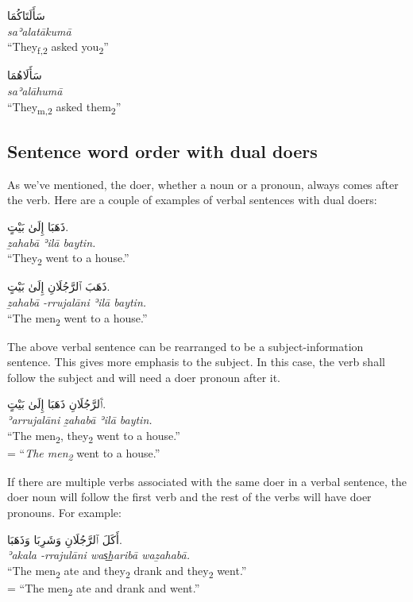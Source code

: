 \documentclass[
  10pt,
]{book}
\begin{document}
\foreignlanguage{arabic}{سَأَلَتَاکُمَا}\\
\emph{saʾalatākumā}\\
\enquote{They\textsubscript{f,2} asked you\textsubscript{2}}

\foreignlanguage{arabic}{سَأَلَاهُمَا}\\
\emph{saʾalāhumā}\\
\enquote{They\textsubscript{m,2} asked them\textsubscript{2}}

\subsection{Sentence word order with dual doers}\label{sentence-word-order-with-dual-doers}

As we've mentioned, the doer, whether a noun or a pronoun, always comes after the verb. Here are a couple of examples of verbal sentences with dual doers:

\foreignlanguage{arabic}{ذَهَبَا إِلَىٰ بَيْتٍ.}\\
\emph{ẕahabā ʾilā baytin.}\\
\enquote{They\textsubscript{2} went to a house.}

\foreignlanguage{arabic}{ذَهَبَ ٱلرَّجُلَانِ إِلَىٰ بَيْتٍ.}\\
\emph{ẕahabā -rrujalāni ʾilā baytin.}\\
\enquote{The men\textsubscript{2} went to a house.}

The above verbal sentence can be rearranged to be a subject-information sentence. This gives more emphasis to the subject. In this case, the verb shall follow the subject and will need a doer pronoun after it.

\foreignlanguage{arabic}{ٱَلرَّجُلَانِ ذَهَبَا إِلَىٰ بَيْتٍ.}\\
\emph{ʾarrujalāni ẕahabā ʾilā baytin.}\\
\enquote{The men\textsubscript{2}, they\textsubscript{2} went to a house.}\\
= \enquote{\emph{The men\textsubscript{2}} went to a house.}

If there are multiple verbs associated with the same doer in a verbal sentence, the doer noun will follow the first verb and the rest of the verbs will have doer pronouns. For example:

\foreignlanguage{arabic}{أَکَلَ ٱلرَّجُلَانِ وَشَرِبَا وَذَهَبَا.}\\
\emph{ʾakala -rrajulāni was͟haribā waẕahabā.}\\
\enquote{The men\textsubscript{2} ate and they\textsubscript{2} drank and they\textsubscript{2} went.}\\
= \enquote{The men\textsubscript{2} ate and drank and went.}
\end{document}

